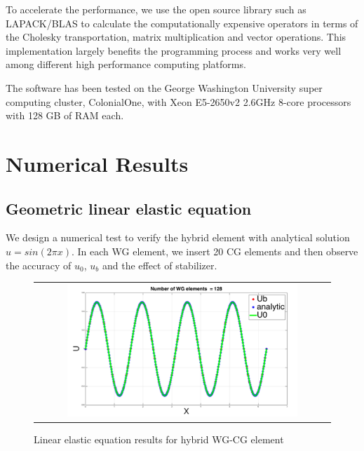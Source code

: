    To accelerate the performance, we use the open source library such as LAPACK/BLAS to calculate the computationally expensive operators in terms of the Cholesky transportation, matrix multiplication and vector operations. This implementation largely benefits the programming process and works very well among different high performance computing platforms.
   
   The software has been tested on the George Washington University super computing cluster, ColonialOne, with Xeon E5-2650v2 2.6GHz 8-core processors with 128 GB of RAM each.
   
   \section{Numerical Results}
   
   \subsection{Geometric linear elastic equation}
   
   We design a numerical test to verify the hybrid element with analytical solution $ u = sin (2 \pi x) $. In each WG element, we insert 20 CG elements and then observe the accuracy of $ u_0 $, $ u_b $ and the effect of stabilizer.
   
      \begin{figure}[H]
      	\centering
      	\begin{tabular}{c}
      		\includegraphics[width=0.8\textwidth]{./pics/result1d1.png}
      	\end{tabular}
      	\caption{\footnotesize Linear elastic equation results for hybrid WG-CG element}
      \end{figure}
      
